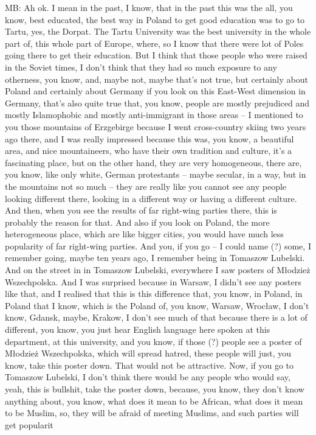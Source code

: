 MB: Ah ok. I mean in the past, I know, that in the past this was the all, you know, best educated, the best way in Poland to get good education was to go to Tartu, yes, the Dorpat. The Tartu University was the best university in the whole part of, this whole part of Europe, where, so I know that there were lot of Poles going there to get their education. But I think that those people who were raised in the Soviet times, I don’t think that they had so much exposure to any otherness, you know, and, maybe not, maybe that’s not true, but certainly about Poland and certainly about Germany if you look on this East-West dimension in Germany, that’s also quite true that, you know, people are mostly prejudiced and mostly Islamophobic and mostly anti-immigrant in those areas – I mentioned to you those mountains of Erzgebirge because I went cross-country skiing two years ago there, and I was really impressed because this was, you know, a beautiful area, and nice mountaineers, who have their own tradition and culture, it’s a fascinating place, but on the other hand, they are very homogeneous, there are, you know, like only white, German protestants – maybe secular, in a way, but in the mountains not so much – they are really like you cannot see any people looking different there, looking in a different way or having a different culture. And then, when you see the results of far right-wing parties there, this is probably the reason for that. And also if you look on Poland, the more heterogeneous place, which are like bigger cities, you would have much less popularity of far right-wing parties. And you, if you go – I could name (?) some, I remember going, maybe ten years ago, I remember being in Tomaszow Lubelski. And on the street in in Tomaszow Lubelski, everywhere I saw posters of Młodzież Wszechpolska. And I was surprised because in Warsaw, I didn’t see any posters like that, and I realised that this is this difference that, you know, in Poland, in Poland that I know, which is the Poland of, you know, Warsaw, Wrocław, I don’t know, Gdansk, maybe, Krakow, I don’t see much of that because there is a lot of different, you know, you just hear English language here spoken at this department, at this university, and you know, if those (?) people see a poster of Młodzież Wszechpolska, which will spread hatred, these people will just, you know, take this poster down. That would not be attractive. Now, if you go to Tomaszow Lubelski, I don’t think there would be any people who would say, yeah, this is bullshit, take the poster down, because, you know, they don’t know anything about, you know, what does it mean to be African, what does it mean to be Muslim, so, they will be afraid of meeting Muslims, and such parties will get popularit

